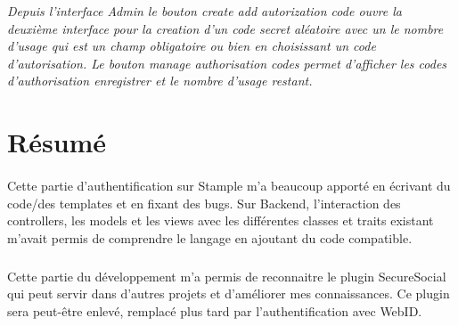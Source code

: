 \textit{Depuis l'interface Admin le bouton create add autorization code ouvre la deuxième interface pour la creation d'un code secret aléatoire avec un le nombre d'usage qui est un champ obligatoire ou bien en choisissant un code d'autorisation.
Le bouton manage authorisation codes permet d'afficher les codes d'authorisation enregistrer et le nombre d'usage restant.
}
\section{Résumé}
\paragraph{}
Cette partie d'authentification sur Stample m'a beaucoup apporté en écrivant du code/des templates et en fixant des bugs.
Sur Backend, l'interaction des controllers, les models et les views avec les différentes classes et traits existant m'avait permis de comprendre le langage en ajoutant du code compatible.
\subparagraph{}
Cette partie du développement m'a permis de reconnaitre le plugin SecureSocial qui peut servir dans d'autres projets et d'améliorer mes connaissances. 
Ce plugin sera peut-être enlevé, remplacé plus tard par l'authentification avec WebID. 
